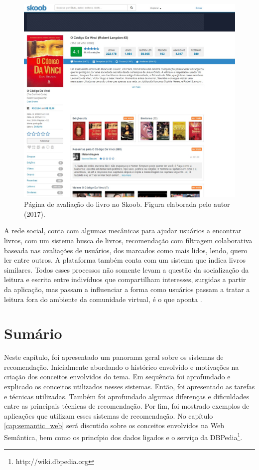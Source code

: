 \begin{figure}
	\centering
	\includegraphics[scale=0.40]{imagens/skoob_recsys.jpg}
	\caption{Página de avaliação do livro no Skoob. Figura elaborada pelo autor (2017).}
	\label{fig:skoob}
\end{figure}

A rede social, conta com algumas mecânicas para ajudar usuários a encontrar livros, com um sistema busca de livros, recomendação com filtragem colaborativa baseada nas avaliações de usuários, dos marcados como mais lidos, lendo, quero ler entre outros. A plataforma também conta com um sistema que indica livros similares. Todos esses processos não somente levam a questão da socialização da leitura e escrita entre indivíduos que compartilham interesses, surgidas a partir da aplicação, mas passam a influenciar a forma como usuários passam a tratar a leitura fora do ambiente da comunidade virtual, é o que aponta \cite{SkoobUFPE:2010}.

\section{Sumário}

Neste capítulo, foi apresentado um panorama geral sobre os sistemas de recomendação. Inicialmente abordando o histórico envolvido e motivações na criação dos conceitos envolvidos do tema. Em sequência foi aprofundado e explicado os conceitos utilizados nesses sistemas. Então, foi apresentado as tarefas e técnicas utilizadas. Também foi aprofundado algumas diferenças e dificuldades entre as principais técnicas de recomendação. Por fim, foi mostrado exemplos de aplicações que utilizam esses sistemas de recomendação. No capítulo \ref{cap:semantic_web} será discutido sobre os conceitos envolvidos na Web Semântica, bem como os princípio dos dados ligados e o serviço da DBPedia\footnote{http://wiki.dbpedia.org}.